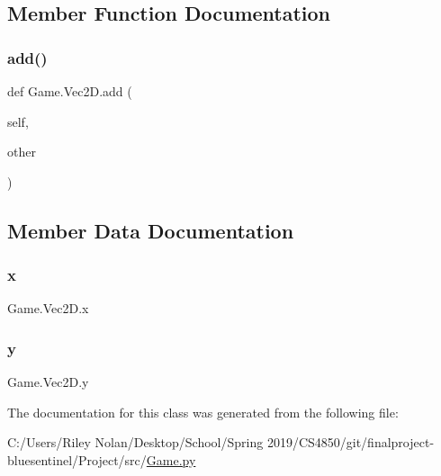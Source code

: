 \subsection{Member Function Documentation}
\mbox{\label{class_game_1_1_vec2_d_a78a89c05c6ec8f6432e2b020c1331105}} 
\subsubsection{\texorpdfstring{add()}{add()}}
{\footnotesize\ttfamily def Game.\+Vec2\+D.\+add (\begin{DoxyParamCaption}\item[{}]{self,  }\item[{}]{other }\end{DoxyParamCaption})}



\subsection{Member Data Documentation}
\mbox{\label{class_game_1_1_vec2_d_ab2c0014ad0db9e875903d45f730330d2}} 
\subsubsection{\texorpdfstring{x}{x}}
{\footnotesize\ttfamily Game.\+Vec2\+D.\+x}

\mbox{\label{class_game_1_1_vec2_d_a068fdc17613b855c4974fb2fd2ae047c}} 
\subsubsection{\texorpdfstring{y}{y}}
{\footnotesize\ttfamily Game.\+Vec2\+D.\+y}



The documentation for this class was generated from the following file\+:\begin{DoxyCompactItemize}
\item 
C\+:/\+Users/\+Riley Nolan/\+Desktop/\+School/\+Spring 2019/\+C\+S4850/git/finalproject-\/bluesentinel/\+Project/src/\mbox{\hyperlink{_game_8py}{Game.\+py}}\end{DoxyCompactItemize}
